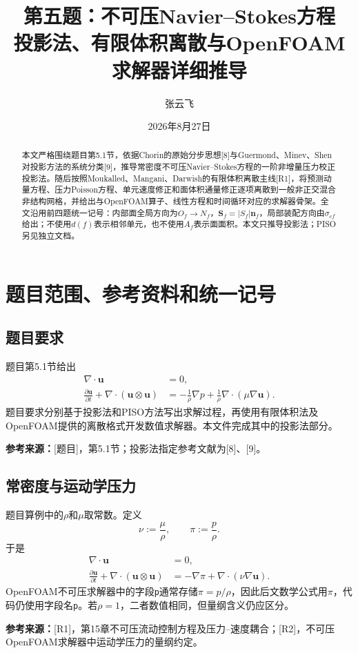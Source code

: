 \documentclass[UTF8,12pt,a4paper]{ctexart}
\title{\bfseries 第五题：不可压Navier--Stokes方程\\投影法、有限体积离散与OpenFOAM求解器详细推导}
\author{张云飞}
\date{2026年8月27日}
\numberwithin{equation}{section}
\newcommand{\Task}{\textnormal{[题目]}}
\newcommand{\Chorin}{\textnormal{[8]}}
\newcommand{\Guermond}{\textnormal{[9]}}
\newcommand{\Rone}{\textnormal{[R1]}}
\newcommand{\Rtwo}{\textnormal{[R2]}}
\newcommand{\source}[1]{\par\smallskip\noindent\colorbox{sourcebg}{%
  \parbox{0.955\linewidth}{\footnotesize\color{sourcegray}\textbf{参考来源：}#1}}\par\smallskip}
\begin{document}
\maketitle
\begin{abstract}
本文严格围绕题目第5.1节，依据Chorin的原始分步思想\Chorin 与Guermond、Minev、Shen对投影方法的系统分类\Guermond，推导常密度不可压Navier--Stokes方程的一阶非增量压力校正投影法。随后按照Moukalled、Mangani、Darwish的有限体积离散主线\Rone，将预测动量方程、压力Poisson方程、单元速度修正和面体积通量修正逐项离散到一般非正交混合非结构网格，并给出与OpenFOAM算子、线性方程和时间循环对应的求解器骨架。全文沿用前四题统一记号：内部面全局方向为$O_f\to N_f$，$\bm S_f=|S_f|\bm n_f$，局部装配方向由$\sigma_{cf}$给出；不使用$d(f)$表示相邻单元，也不使用$A_f$表示面面积。本文只推导投影法；PISO另见独立文档。
\end{abstract}
\tableofcontents
\newpage

\section*{题目范围、参考资料和统一记号}
\subsection*{题目要求}
题目第5.1节给出
\begin{align}
  \nabla\cdot\bm u&=0,\label{eq:continuity}\\
  \frac{\partial\bm u}{\partial t}+\nabla\cdot(\bm u\otimes\bm u)
  &=-\frac{1}{\rho}\nabla p+\frac{1}{\rho}\nabla\cdot(\mu\nabla\bm u).
  \label{eq:momentum}
\end{align}
题目要求分别基于投影法和PISO方法写出求解过程，再使用有限体积法及OpenFOAM提供的离散格式开发数值求解器。本文件完成其中的投影法部分。
\source{\Task，第5.1节；投影法指定参考文献为\Chorin、\Guermond。}

\subsection*{常密度与运动学压力}
题目算例中的$\rho$和$\mu$取常数。定义
\begin{equation}
  \boxed{\nu:=\frac{\mu}{\rho},\qquad \pi:=\frac{p}{\rho}.}
  \label{eq:kinematic}
\end{equation}
于是
\begin{align}
  \nabla\cdot\bm u&=0,\label{eq:continuity_pi}\\
  \frac{\partial\bm u}{\partial t}+\nabla\cdot(\bm u\otimes\bm u)
  &=-\nabla\pi+\nabla\cdot(\nu\nabla\bm u).
  \label{eq:momentum_pi}
\end{align}
OpenFOAM不可压求解器中的字段\texttt{p}通常存储$\pi=p/\rho$，因此后文数学公式用$\pi$，代码仍使用字段名\texttt{p}。若$\rho=1$，二者数值相同，但量纲含义仍应区分。
\source{\Rone，第15章不可压流动控制方程及压力--速度耦合；\Rtwo，不可压OpenFOAM求解器中运动学压力的量纲约定。}
\end{document}
